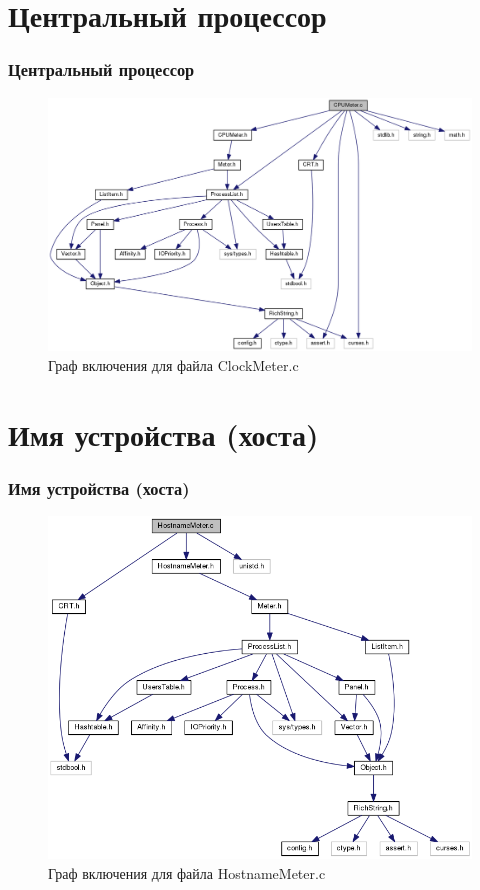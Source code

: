 \documentclass{beamer}
\begin{document}
\section{Центральный процессор}

\begin{frame}
\frametitle{Центральный процессор}

\begin{figure}
\includegraphics[scale=0.3]{res/cpu_meter.png}
\caption{Граф включения для файла ClockMeter.c}
\end{figure}

\end{frame}
\section{Имя устройства (хоста)}

\begin{frame}
\frametitle{Имя устройства (хоста)}

\begin{figure}
\includegraphics[scale=0.3]{res/hostname_meter.png}
\caption{Граф включения для файла HostnameMeter.c}
\end{figure}

\end{frame}
\end{document}

